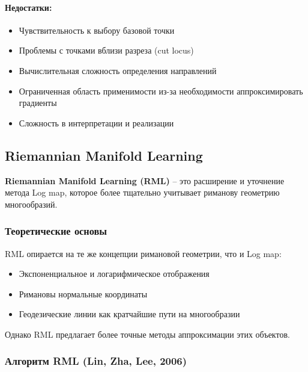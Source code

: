 \documentclass[a4paper,12pt]{article}
\begin{document}
\paragraph{Недостатки:}
\begin{itemize}
    \item Чувствительность к выбору базовой точки
    \item Проблемы с точками вблизи разреза (cut locus)
    \item Вычислительная сложность определения направлений
    \item Ограниченная область применимости из-за необходимости аппроксимировать градиенты
    \item Сложность в интерпретации и реализации
\end{itemize}

\subsection{Riemannian Manifold Learning}

\textbf{Riemannian Manifold Learning (RML)} -- это расширение и уточнение метода Log map, которое более тщательно учитывает риманову геометрию многообразий.

\subsubsection{Теоретические основы}

RML опирается на те же концепции римановой геометрии, что и Log map:
\begin{itemize}
    \item Экспоненциальное и логарифмическое отображения
    \item Римановы нормальные координаты
    \item Геодезические линии как кратчайшие пути на многообразии
\end{itemize}

Однако RML предлагает более точные методы аппроксимации этих объектов.

\subsubsection{Алгоритм RML (Lin, Zha, Lee, 2006)}
\end{document}

